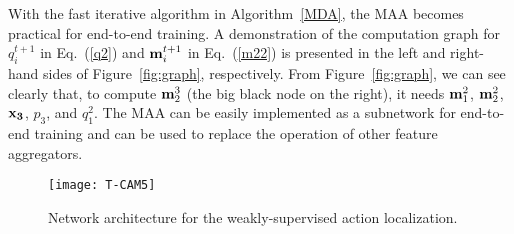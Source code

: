 \documentclass{article} \usepackage{iclr2019_conference,times}
\begin{document}
With the fast iterative algorithm in Algorithm~\ref{MDA}, the MAA becomes practical for end-to-end training.
A demonstration of the computation graph for $ q_{i}^{t+1} $ in Eq.~(\ref{q2}) and ${\bf m}_{i}^{t+1} $ in Eq.~(\ref{m22}) is presented in the left and right-hand sides of Figure~\ref{fig:graph}, respectively. 
From Figure~\ref{fig:graph}, we can see clearly that, to compute ${\bf m}^3_2$ (the big black node on the right), it needs ${\bf m}^2_1$, ${\bf m}^2_2$, $\bf{x}_{3}$, $p_{3}$, and $q^2_1$.
The MAA can be easily implemented as a subnetwork for end-to-end training and can be used to replace the operation of other feature aggregators.









































































\begin{figure*}[t!]
\centering
\texttt{[image: T-CAM5]}\vspace{-4mm}
\caption{Network architecture for the weakly-supervised action localization.}
\vspace{-4mm}
\label{fig:tcam}
\end{figure*}
\vspace{-2mm}
\end{document}
